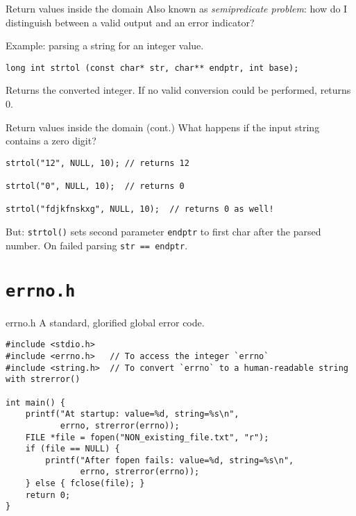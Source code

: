 \documentclass[aspectratio=169,14pt]{beamer}
\begin{document}
\begin{frame}[fragile]{Return values inside the domain}
Also known as \textit{semipredicate problem}: how do I distinguish between a valid output and an error indicator?

Example: parsing a string for an integer value.

\begin{lstlisting}[style=cstyle]
long int strtol (const char* str, char** endptr, int base);
\end{lstlisting}

Returns the converted integer. If no valid conversion could be performed, returns 0.
\end{frame}

\begin{frame}[fragile]{Return values inside the domain (cont.)}
What happens if the input string contains a zero digit?

\begin{lstlisting}[style=cstyle]
strtol("12", NULL, 10); // returns 12

strtol("0", NULL, 10);  // returns 0

strtol("fdjkfnskxg", NULL, 10);  // returns 0 as well!
\end{lstlisting}

But: \texttt{strtol()} sets second parameter \texttt{endptr} to first char after the parsed number. On failed parsing \texttt{str == endptr}.
\end{frame}


\section{\texttt{errno.h}}

\begin{frame}[fragile]{errno.h}
A standard, glorified global error code.

\begin{lstlisting}[style=cstyle]
#include <stdio.h>
#include <errno.h>   // To access the integer `errno`
#include <string.h>  // To convert `errno` to a human-readable string with strerror()

int main() {
    printf("At startup: value=%d, string=%s\n",
           errno, strerror(errno));
    FILE *file = fopen("NON_existing_file.txt", "r");
    if (file == NULL) {
        printf("After fopen fails: value=%d, string=%s\n",
               errno, strerror(errno));
    } else { fclose(file); }
    return 0;
}
\end{lstlisting}
\end{frame}
\end{document}
